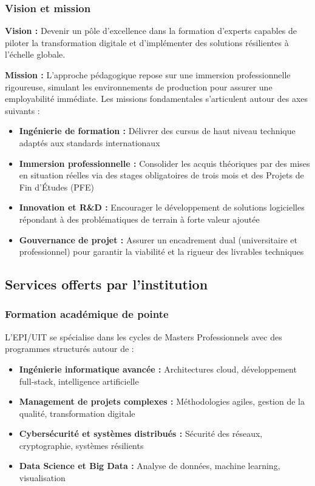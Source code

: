\subsubsection{Vision et mission}
\textbf{Vision :} Devenir un pôle d'excellence dans la formation d'experts capables de piloter la transformation digitale et d'implémenter des solutions résilientes à l'échelle globale.

\textbf{Mission :} L'approche pédagogique repose sur une immersion professionnelle rigoureuse, simulant les environnements de production pour assurer une employabilité immédiate. Les missions fondamentales s'articulent autour des axes suivants :

\begin{itemize}
    \item \textbf{Ingénierie de formation :} Délivrer des cursus de haut niveau technique adaptés aux standards internationaux
    \item \textbf{Immersion professionnelle :} Consolider les acquis théoriques par des mises en situation réelles via des stages obligatoires de trois mois et des Projets de Fin d'Études (PFE)
    \item \textbf{Innovation et R\&D :} Encourager le développement de solutions logicielles répondant à des problématiques de terrain à forte valeur ajoutée
    \item \textbf{Gouvernance de projet :} Assurer un encadrement dual (universitaire et professionnel) pour garantir la viabilité et la rigueur des livrables techniques
\end{itemize}

\subsection{Services offerts par l'institution}

\subsubsection{Formation académique de pointe}
L'EPI/UIT se spécialise dans les cycles de Masters Professionnels avec des programmes structurés autour de :
\begin{itemize}
    \item \textbf{Ingénierie informatique avancée :} Architectures cloud, développement full-stack, intelligence artificielle
    \item \textbf{Management de projets complexes :} Méthodologies agiles, gestion de la qualité, transformation digitale
    \item \textbf{Cybersécurité et systèmes distribués :} Sécurité des réseaux, cryptographie, systèmes résilients
    \item \textbf{Data Science et Big Data :} Analyse de données, machine learning, visualisation
\end{itemize}

